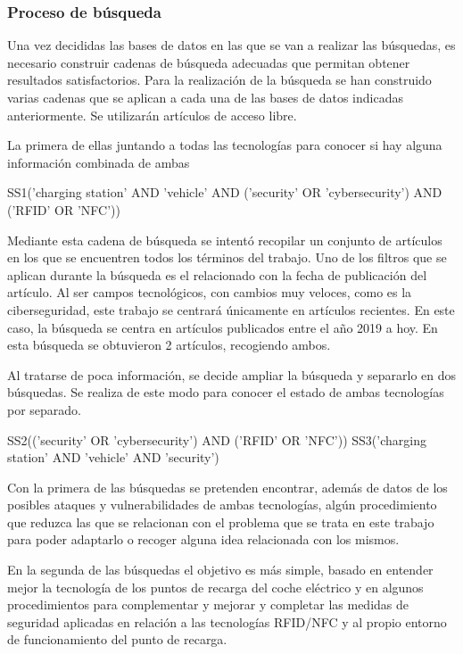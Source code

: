 \documentclass[12pt,a4paper,onecolumn,oneside]{report}
\begin{document}
\subsubsection{Proceso de búsqueda}

Una vez decididas las bases de datos en las que se van a realizar las búsquedas, es necesario construir cadenas de búsqueda adecuadas que permitan obtener resultados satisfactorios. Para la realización de la búsqueda se han construido varias cadenas que se aplican a cada una de las bases de datos indicadas anteriormente. Se utilizarán artículos de acceso libre.

La primera de ellas juntando a todas las tecnologías para conocer si hay alguna información combinada de ambas

SS1('charging station' AND 'vehicle' AND ('security' OR 'cybersecurity') AND ('RFID' OR 'NFC'))

Mediante esta cadena de búsqueda se intentó recopilar un conjunto de artículos en los que se encuentren todos los términos del trabajo. Uno de los filtros que se aplican durante la búsqueda es el relacionado con la fecha de publicación del artículo. Al ser campos tecnológicos, con cambios muy veloces, como es la ciberseguridad, este trabajo se centrará únicamente en artículos recientes. En este caso, la búsqueda se centra en artículos publicados entre el año 2019 a hoy. En esta búsqueda se obtuvieron 2 artículos, recogiendo ambos. 

Al tratarse de poca información, se decide ampliar la búsqueda y separarlo en dos búsquedas. Se realiza de este modo para conocer el estado de ambas tecnologías por separado. 

SS2(('security' OR 'cybersecurity') AND ('RFID' OR 'NFC'))
SS3('charging station' AND 'vehicle' AND 'security')

Con la primera de las búsquedas se pretenden encontrar, además de datos de los posibles ataques y vulnerabilidades de ambas tecnologías, algún procedimiento que reduzca las que se relacionan con el problema que se trata en este trabajo para poder adaptarlo o recoger alguna idea relacionada con los mismos.

En la segunda de las búsquedas el objetivo es más simple, basado en entender mejor la tecnología de los puntos de recarga del coche eléctrico y en algunos procedimientos para complementar y mejorar y completar las medidas de seguridad aplicadas en relación a las tecnologías RFID/NFC y al propio entorno de funcionamiento del punto de recarga.
\end{document}

